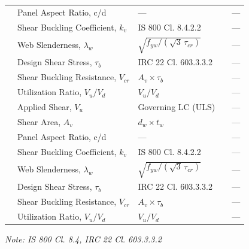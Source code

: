 \documentclass[12pt,a4paper]{report}
\numberwithin{table}{chapter}
\numberwithin{figure}{chapter}
\begin{document}
\begin{longtable}{|C{2.5cm}|C{3.5cm}|C{3.5cm}|>{\centering\arraybackslash}p{4.2cm}|C{1.8cm}|}
 & Panel Aspect Ratio, c/d & --- &  & --- \\[6pt]
 & Shear Buckling Coefficient, $k_v$ & IS 800 Cl. 8.4.2.2 &  & --- \\[6pt]
 & Web Slenderness, $\lambda_w$ & $\sqrt{f_{yw}/(\sqrt{3}\,\tau_{cr})}$ &  & --- \\[6pt]
 & Design Shear Stress, $\tau_b$ & IRC 22 Cl. 603.3.3.2 &  & --- \\[6pt]
 & Shear Buckling Resistance, $V_{cr}$ & $A_v \times \tau_b$ &  & --- \\[6pt]
 & Utilization Ratio, $V_u / V_d$ & $V_u / V_d$ &  & --- \\[6pt]
\hline
{} & Applied Shear, $V_u$ & Governing LC (ULS) &  & --- \\[6pt]
 & Shear Area, $A_v$ & $d_w \times t_w$ &  & --- \\[6pt]
 & Panel Aspect Ratio, c/d & --- &  & --- \\[6pt]
 & Shear Buckling Coefficient, $k_v$ & IS 800 Cl. 8.4.2.2 &  & --- \\[6pt]
 & Web Slenderness, $\lambda_w$ & $\sqrt{f_{yw}/(\sqrt{3}\,\tau_{cr})}$ &  & --- \\[6pt]
 & Design Shear Stress, $\tau_b$ & IRC 22 Cl. 603.3.3.2 &  & --- \\[6pt]
 & Shear Buckling Resistance, $V_{cr}$ & $A_v \times \tau_b$ &  & --- \\[6pt]
 & Utilization Ratio, $V_u / V_d$ & $V_u / V_d$ &  & --- \\[6pt]
\hline
\end{longtable}
\noindent\textit{Note: IS 800 Cl. 8.4, IRC 22 Cl. 603.3.3.2}
\end{document}
